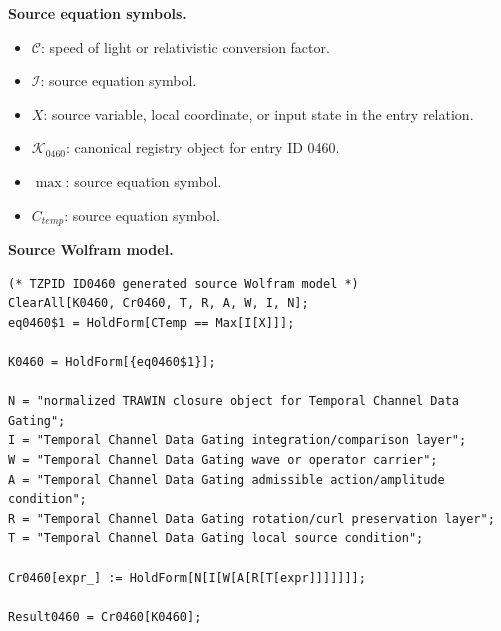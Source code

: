 \begin{minipage}[t]{0.49\linewidth}
\begingroup
\small
\raggedright
\textbf{Source equation symbols.}\par
\begin{itemize}[leftmargin=1.35em,itemsep=1pt,topsep=1pt,parsep=0pt]
    \item $\mathcal{C}$: speed of light or relativistic conversion factor.
    \item $\mathcal{I}$: source equation symbol.
    \item $X$: source variable, local coordinate, or input state in the entry relation.
    \item $\mathcal{K}_{0460}$: canonical registry object for entry ID 0460.
    \item $\max$: source equation symbol.
    \item $C_{temp}$: source equation symbol.
\end{itemize}
\endgroup
\end{minipage}\hfill
\begin{minipage}[t]{0.47\linewidth}
\begingroup
\scriptsize
\raggedright
\textbf{Source Wolfram model.}\par
\begin{Verbatim}[fontsize=\tiny,breaklines=true,breakanywhere=true]
(* TZPID ID0460 generated source Wolfram model *)
ClearAll[K0460, Cr0460, T, R, A, W, I, N];
eq0460$1 = HoldForm[CTemp == Max[I[X]]];

K0460 = HoldForm[{eq0460$1}];

N = "normalized TRAWIN closure object for Temporal Channel Data Gating";
I = "Temporal Channel Data Gating integration/comparison layer";
W = "Temporal Channel Data Gating wave or operator carrier";
A = "Temporal Channel Data Gating admissible action/amplitude condition";
R = "Temporal Channel Data Gating rotation/curl preservation layer";
T = "Temporal Channel Data Gating local source condition";

Cr0460[expr_] := HoldForm[N[I[W[A[R[T[expr]]]]]]];

Result0460 = Cr0460[K0460];
\end{Verbatim}
\endgroup
\end{minipage}

